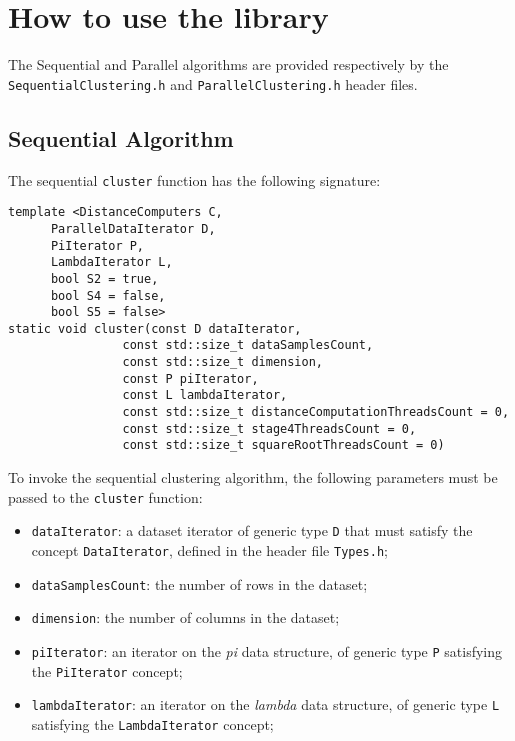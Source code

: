 \documentclass{article}
\begin{document}
\hypertarget{how-to-use-the-library}{%
\section{How to use the library}\label{how-to-use-the-library}}

The Sequential and Parallel algorithms are provided respectively by the
\texttt{SequentialClustering.h} and \texttt{ParallelClustering.h} header
files.

\hypertarget{sequential-algorithm}{%
\subsection{Sequential Algorithm}\label{sequential-algorithm}}

The sequential \texttt{cluster} function has the following signature:

\begin{verbatim}
template <DistanceComputers C,
      ParallelDataIterator D,
      PiIterator P,
      LambdaIterator L,
      bool S2 = true,
      bool S4 = false,
      bool S5 = false>
static void cluster(const D dataIterator,
                const std::size_t dataSamplesCount,
                const std::size_t dimension,
                const P piIterator,
                const L lambdaIterator,
                const std::size_t distanceComputationThreadsCount = 0,
                const std::size_t stage4ThreadsCount = 0,
                const std::size_t squareRootThreadsCount = 0)
\end{verbatim}


To invoke the sequential clustering algorithm, the following parameters
must be passed to the \texttt{cluster} function:

\begin{itemize}

\item
  \texttt{dataIterator}: a dataset iterator of generic type \texttt{D}
  that must satisfy the concept \texttt{DataIterator}, defined in the
  header file \texttt{Types.h};
\item
  \texttt{dataSamplesCount}: the number of rows in the dataset;
\item
  \texttt{dimension}: the number of columns in the dataset;
\item
  \texttt{piIterator}: an iterator on the \emph{pi} data structure, of
  generic type \texttt{P} satisfying the \texttt{PiIterator} concept;
\item
  \texttt{lambdaIterator}: an iterator on the \emph{lambda} data
  structure, of generic type \texttt{L} satisfying the
  \texttt{LambdaIterator} concept;
\end{itemize}
\end{document}
